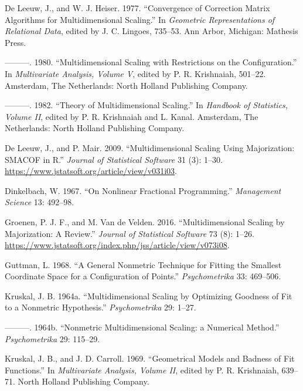 \documentclass[
  12pt,
  letterpaper,
  DIV=11,
  numbers=noendperiod]{scrartcl}
\newlength{\cslhangindent}
\newenvironment{CSLReferences}[2] %
 {\begin{list}{}{%
  \setlength{\itemindent}{0pt}
  \setlength{\leftmargin}{0pt}
  \setlength{\parsep}{0pt}
  \ifodd #1
   \setlength{\leftmargin}{\cslhangindent}
   \setlength{\itemindent}{-1\cslhangindent}
  \fi
  \setlength{\itemsep}{#2\baselineskip}}}
 {\end{list}}
\theoremstyle{plain}
\theoremstyle{remark}
\begin{document}
\begin{CSLReferences}{1}{0}
De Leeuw, J., and W. J. Heiser. 1977. {``Convergence of Correction
Matrix Algorithms for Multidimensional Scaling.''} In \emph{Geometric
Representations of Relational Data}, edited by J. C. Lingoes, 735--53.
Ann Arbor, Michigan: Mathesis Press.

---------. 1980. {``Multidimensional Scaling with Restrictions on the
Configuration.''} In \emph{Multivariate Analysis, Volume {V}}, edited by
P. R. Krishnaiah, 501--22. Amsterdam, The Netherlands: North Holland
Publishing Company.

---------. 1982. {``Theory of Multidimensional Scaling.''} In
\emph{Handbook of Statistics, Volume {II}}, edited by P. R. Krishnaiah
and L. Kanal. Amsterdam, The Netherlands: North Holland Publishing
Company.

De Leeuw, J., and P. Mair. 2009. {``{Multidimensional Scaling Using
Majorization: SMACOF in R}.''} \emph{Journal of Statistical Software} 31
(3): 1--30. \url{https://www.jstatsoft.org/article/view/v031i03}.

Dinkelbach, W. 1967. {``{On Nonlinear Fractional Programming}.''}
\emph{Management Science} 13: 492--98.

Groenen, P. J. F., and M. Van de Velden. 2016. {``{Multidimensional
Scaling by Majorization: A Review}.''} \emph{Journal of Statistical
Software} 73 (8): 1--26.
\url{https://www.jstatsoft.org/index.php/jss/article/view/v073i08}.

Guttman, L. 1968. {``{A General Nonmetric Technique for Fitting the
Smallest Coordinate Space for a Configuration of Points}.''}
\emph{Psychometrika} 33: 469--506.

Kruskal, J. B. 1964a. {``{Multidimensional Scaling by Optimizing
Goodness of Fit to a Nonmetric Hypothesis}.''} \emph{Psychometrika} 29:
1--27.

---------. 1964b. {``{Nonmetric Multidimensional Scaling: a Numerical
Method}.''} \emph{Psychometrika} 29: 115--29.

Kruskal, J. B., and J. D. Carroll. 1969. {``{Geometrical Models and
Badness of Fit Functions}.''} In \emph{Multivariate Analysis, Volume
II}, edited by P. R. Krishnaiah, 639--71. North Holland Publishing
Company.


\end{CSLReferences}
\end{document}
